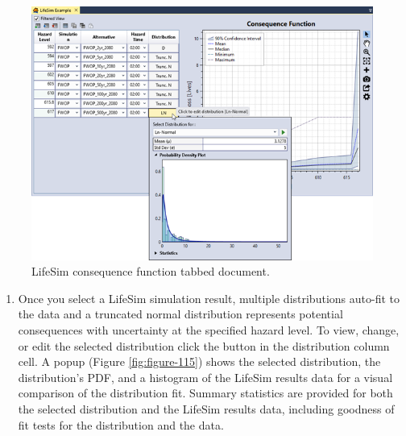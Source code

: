\documentclass[
]{book}
\providecommand{\tightlist}{%
  \setlength{\itemsep}{0pt}\setlength{\parskip}{0pt}}
\begin{document}
\begin{figure}

{\centering \includegraphics{images/figure114} 

}

\caption{LifeSim consequence function tabbed document.}\label{fig:figure-114}
\end{figure}

\begin{enumerate}
\def\labelenumi{\arabic{enumi}.}
\setcounter{enumi}{2}
\tightlist
\item
  Once you select a LifeSim simulation result, multiple distributions auto-fit to the data and a truncated normal distribution represents potential consequences with uncertainty at the specified hazard level. To view, change, or edit the selected distribution click the button in the distribution column cell. A popup (Figure \ref{fig:figure-115}) shows the selected distribution, the distribution's PDF, and a histogram of the LifeSim results data for a visual comparison of the distribution fit. Summary statistics are provided for both the selected distribution and the LifeSim results data, including goodness of fit tests for the distribution and the data.
\end{enumerate}
\end{document}
